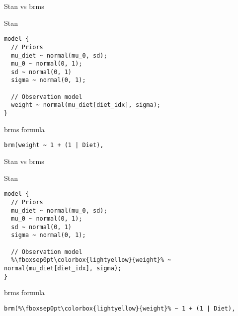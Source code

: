\documentclass[finnish,english,t]{beamer}
\begin{document}
\begin{frame}[fragile]{Stan vs brms}

  \vspace{-0.5\baselineskip}

  Stan 
  
\vspace{-0.5\baselineskip}
{\small
\begin{verbatim}
model {
  // Priors
  mu_diet ~ normal(mu_0, sd);
  mu_0 ~ normal(0, 1);
  sd ~ normal(0, 1)
  sigma ~ normal(0, 1);
  
  // Observation model
  weight ~ normal(mu_diet[diet_idx], sigma);
}
\end{verbatim}

  brms formula
  \vspace{-0.5\baselineskip}
\begin{verbatim}  
brm(weight ~ 1 + (1 | Diet),
\end{verbatim}
}

\end{frame}

\begin{frame}[fragile]{Stan vs brms}

  \vspace{-0.5\baselineskip}

  Stan
  
\vspace{-0.5\baselineskip}
{\small
\begin{verbatim}
model {
  // Priors
  mu_diet ~ normal(mu_0, sd);
  mu_0 ~ normal(0, 1);
  sd ~ normal(0, 1)
  sigma ~ normal(0, 1);
  
  // Observation model
  %\fboxsep0pt\colorbox{lightyellow}{weight}% ~ normal(mu_diet[diet_idx], sigma);
}
\end{verbatim}

  brms formula
  \vspace{-0.5\baselineskip}
\begin{verbatim}  
brm(%\fboxsep0pt\colorbox{lightyellow}{weight}% ~ 1 + (1 | Diet),
\end{verbatim}
}

\end{frame}
\end{document}
